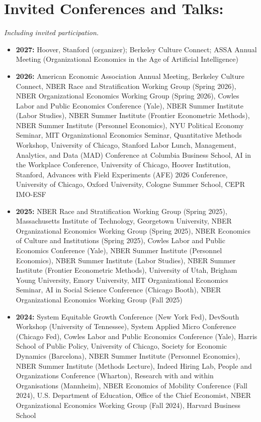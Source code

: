 \documentclass[11pt,letterpaper]{article}
\newcommand{\cvsection}[1]{\Needspace{5\baselineskip}\section*{#1:}}
\begin{document}
\cvsection{Invited Conferences and Talks}
{\small\itshape Including invited participation.}\par\vspace{4pt}
\begin{itemize}
\item \textbf{2027:} Hoover, Stanford (organizer); Berkeley Culture Connect; ASSA Annual Meeting (Organizational Economics in the Age of Artificial Intelligence)
\item \textbf{2026:} American Economic Association Annual Meeting, Berkeley Culture Connect, NBER Race and Stratification Working Group (Spring 2026), NBER Organizational Economics Working Group (Spring 2026), Cowles Labor and Public Economics Conference (Yale), NBER Summer Institute (Labor Studies), NBER Summer Institute (Frontier Econometric Methods), NBER Summer Institute (Personnel Economics), NYU Political Economy Seminar, MIT Organizational Economics Seminar, Quantitative Methods Workshop, University of Chicago, Stanford Labor Lunch, Management, Analytics, and Data (MAD) Conference at Columbia Business School, AI in the Workplace Conference, University of Chicago, Hoover Institution, Stanford, Advances with Field Experiments (AFE) 2026 Conference, University of Chicago, Oxford University, Cologne Summer School, CEPR IMO-ESF
\item \textbf{2025:} NBER Race and Stratification Working Group (Spring 2025), Massachusetts Institute of Technology, Georgetown University, NBER Organizational Economics Working Group (Spring 2025), NBER Economics of Culture and Institutions (Spring 2025), Cowles Labor and Public Economics Conference (Yale), NBER Summer Institute (Personnel Economics), NBER Summer Institute (Labor Studies), NBER Summer Institute (Frontier Econometric Methods), University of Utah, Brigham Young University, Emory University, MIT Organizational Economics Seminar, AI in Social Science Conference (Chicago Booth), NBER Organizational Economics Working Group (Fall 2025)
\item \textbf{2024:} System Equitable Growth Conference (New York Fed), DevSouth Workshop (University of Tennessee), System Applied Micro Conference (Chicago Fed), Cowles Labor and Public Economics Conference (Yale), Harris School of Public Policy, University of Chicago, Society for Economic Dynamics (Barcelona), NBER Summer Institute (Personnel Economics), NBER Summer Institute (Methods Lecture), Indeed Hiring Lab, People and Organizations Conference (Wharton), Research with and within Organisations (Mannheim), NBER Economics of Mobility Conference (Fall 2024), U.S. Department of Education, Office of the Chief Economist, NBER Organizational Economics Working Group (Fall 2024), Harvard Business School

\end{itemize}
\end{document}
